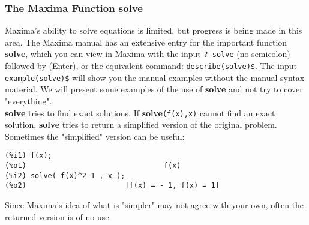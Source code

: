 \documentclass[12pt]{article}
\begin{document}
\subsubsection{The Maxima Function solve}
Maxima's ability to solve equations is limited, but progress is being made in this area.
The Maxima manual has an extensive entry for the important function \textbf{solve},
  which you can view in Maxima with the input \verb|? solve| (no semicolon) followed
    by (Enter), or the equivalent command: \verb|describe(solve)$|.
The input \verb|example(solve)$| will show you the manual examples without the manual
  syntax material.
We will present some examples of the use of \textbf{solve} and not try to cover "everything".\\
\textbf{solve} tries to find exact solutions.
If \textbf{solve}\verb|(f(x),x)| cannot find an exact solution, \textbf{solve} tries to 
  return a simplified version of the original problem.
  Sometimes the "simplified" version can be useful:
\small
\begin{verbatim}
(%i1) f(x);
(%o1)                                f(x)
(%i2) solve( f(x)^2-1 , x );
(%o2)                       [f(x) = - 1, f(x) = 1] 
\end{verbatim}
\normalsize
Since Maxima's idea of what is "simpler" may not agree with your own, often
  the returned version is of no use.  
\newpage
  
\end{document}
